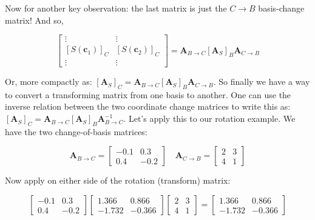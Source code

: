 \documentclass[main.tex]{subfiles}
\begin{document}
    Now for another key observation: the last matrix is just the $C \rightarrow B$ basis-change matrix! And so,
    
    $$
    \left[\begin{array}{cc}
    \vdots & \vdots \\
    {\left[S\left(\mathbf{c}_{1}\right)\right]_{C}} & {\left[S\left(\mathbf{c}_{2}\right)\right]_{C}} \\
    \vdots & \vdots
    \end{array}\right]=\mathbf{A}_{B \rightarrow C}\left[\mathbf{A}_{S}\right]_{B} \mathbf{A}_{C \rightarrow B}
    $$
    
    Or, more compactly as: $\left[\mathbf{A}_{S}\right]_{C}=\mathbf{A}_{B \rightarrow C}\left[\mathbf{A}_{S}\right]_{B} \mathbf{A}_{C \rightarrow B}$. So finally we have a way to convert a transforming matrix from one basis to another. One can use the inverse relation between the two coordinate change matrices to write this as: $\left[\mathbf{A}_{S}\right]_{C}=\mathbf{A}_{B \rightarrow C}\left[\mathbf{A}_{S}\right]_{B} \mathbf{A}_{B \rightarrow C}^{-1}$. Let's apply this to our rotation example. We have the two change-of-basis matrices: 
    
    $$
    \mathbf{A}_{B \rightarrow C}=\left[\begin{array}{cc}
    -0.1 & 0.3 \\
    0.4 & -0.2
    \end{array}\right] \quad \mathbf{A}_{C \rightarrow B}=\left[\begin{array}{ll}
    2 & 3 \\
    4 & 1
    \end{array}\right]
    $$
    
    Now apply on either side of the rotation (transform) matrix:
    
    $$
    \left[\begin{array}{cc}
    -0.1 & 0.3 \\
    0.4 & -0.2
    \end{array}\right]\left[\begin{array}{cc}
    1.366 & 0.866 \\
    -1.732 & -0.366
    \end{array}\right]\left[\begin{array}{ll}
    2 & 3 \\
    4 & 1
    \end{array}\right]=\left[\begin{array}{cc}
    1.366 & 0.866 \\
    -1.732 & -0.366
    \end{array}\right]
    $$
    
\end{document}
